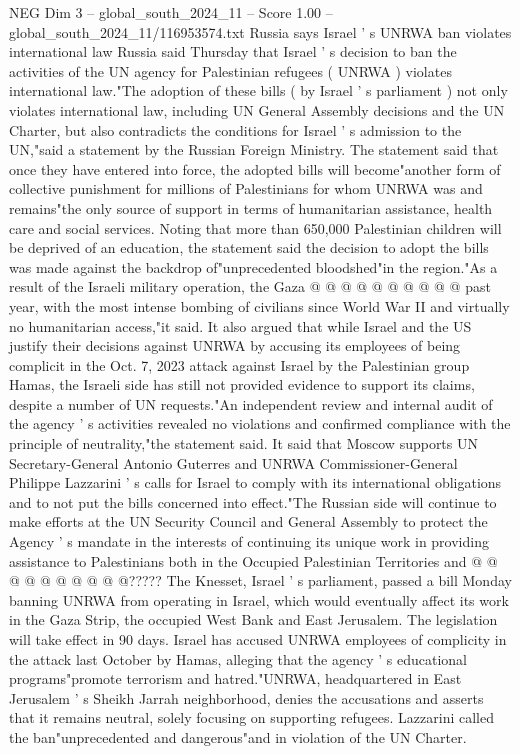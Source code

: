 \begin{textsample}{NEG Dim 3 – global\_south\_2024\_11 – Score 1.00 – global\_south\_2024\_11/116953574.txt}  \label{ex:f3_neg_157}
Russia says Israel ' s UNRWA ban violates international law Russia said Thursday that Israel ' s decision to ban the activities of the UN agency for Palestinian refugees ( UNRWA ) violates international law."The adoption of these bills ( by Israel ' s parliament ) not only violates international law, including UN General Assembly decisions and the UN Charter, but also contradicts the conditions for Israel ' s admission to the UN,"said a statement by the Russian Foreign Ministry.
The statement said that once they have entered into force, the adopted bills will become"another form of collective punishment for millions of Palestinians for whom UNRWA was and remains"the only source of support in terms of humanitarian assistance, health care and social services.
Noting that more than 650,000 Palestinian children will be deprived of an education, the statement said the decision to adopt the bills was made against the backdrop of"unprecedented bloodshed"in the region."As a result of the Israeli military operation, the Gaza @ @ @ @ @ @ @ @ @ @ past year, with the most intense bombing of civilians since World War II and virtually no humanitarian access,"it said.
It also argued that while Israel and the US justify their decisions against UNRWA by accusing its employees of being complicit in the Oct. 7, 2023 attack against Israel by the Palestinian group Hamas, the Israeli side has still not provided evidence to support its claims, despite a number of UN requests."An independent review and internal audit of the agency ' s activities revealed no violations and confirmed compliance with the principle of neutrality,"the statement said.
It said that Moscow supports UN Secretary-General Antonio Guterres and UNRWA Commissioner-General Philippe Lazzarini ' s calls for Israel to comply with its international obligations and to not put the bills concerned into effect."The Russian side will continue to make efforts at the UN Security Council and General Assembly to protect the Agency ' s mandate in the interests of continuing its unique work in providing assistance to Palestinians both in the Occupied Palestinian Territories and @ @ @ @ @ @ @ @ @ @?????
The Knesset, Israel ' s parliament, passed a bill Monday banning UNRWA from operating in Israel, which would eventually affect its work in the Gaza Strip, the occupied West Bank and East Jerusalem.
The legislation will take effect in 90 days.
Israel has accused UNRWA employees of complicity in the attack last October by Hamas, alleging that the agency ' s educational programs"promote terrorism and hatred."UNRWA, headquartered in East Jerusalem ' s Sheikh Jarrah neighborhood, denies the accusations and asserts that it remains neutral, solely focusing on supporting refugees.
Lazzarini called the ban"unprecedented and dangerous"and in violation of the UN Charter.

\end{textsample}
